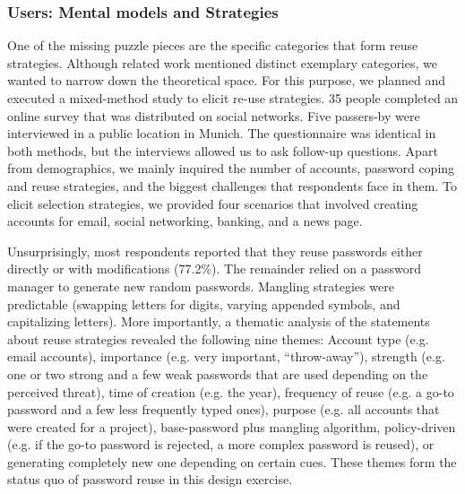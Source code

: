 \subsubsection{Users: Mental models and Strategies}
One of the missing puzzle pieces are the specific categories that form reuse strategies. Although related work mentioned distinct exemplary categories, we wanted to narrow down the theoretical space. For this purpose, we planned and executed a mixed-method study to elicit re-use strategies. 35 people completed an online survey that was distributed on social networks. Five passers-by were interviewed in a public location in Munich. The questionnaire was identical in both methods, but the interviews allowed us to ask follow-up questions. Apart from demographics, we mainly inquired the number of accounts, password coping and reuse strategies, and the biggest challenges that respondents face in them. To elicit selection strategies, we provided four scenarios that involved creating accounts for email, social networking, banking, and a news page.

Unsurprisingly, most respondents reported that they reuse passwords either directly or with modifications (77.2\%). The remainder relied on a password manager to generate new random passwords. Mangling strategies were predictable (swapping letters for digits, varying appended symbols, and capitalizing letters). More importantly, a thematic analysis of the statements about reuse strategies revealed the following nine themes: Account type (e.g. email accounts), importance (e.g. very important, ``throw-away''), strength (e.g. one or two strong and a few weak passwords that are used depending on the perceived threat), time of creation (e.g. the year), frequency of reuse (e.g. a go-to password and a few less frequently typed ones), purpose (e.g. all accounts that were created for a project), base-password plus mangling algorithm, policy-driven (e.g. if the go-to password is rejected, a more complex password is reused), or generating completely new one depending on certain cues. These themes form the status quo of password reuse in this design exercise.  


